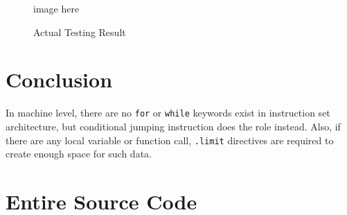\documentclass[a4paper, 12pt]{article}
\begin{document}
    \begin{figure}[H]
        image here

        \centering        
        \caption{Actual Testing Result}
    \end{figure}


    \section{Conclusion}
    In machine level, there are no \texttt{for} or \texttt{while} keywords exist in instruction set architecture, but conditional jumping instruction does the role instead. Also, if there are any local variable or function call, \texttt{.limit} directives are required to create enough space for such data.

    \section{Entire Source Code}
\end{document}
